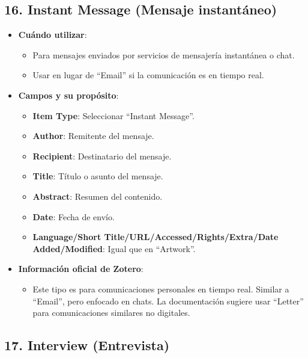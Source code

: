 \documentclass[
  jou,
  floatsintext,
  longtable,
  a4paper,
  nolmodern,
  notxfonts,
  notimes,
  colorlinks=true,linkcolor=blue,citecolor=blue,urlcolor=blue]{apa7}
\providecommand{\tightlist}{%
  \setlength{\itemsep}{0pt}\setlength{\parskip}{0pt}}
\begin{document}
\subsection{16. Instant Message (Mensaje
instantáneo)}\label{instant-message-mensaje-instantuxe1neo}

\begin{itemize}
\tightlist
\item
  \textbf{Cuándo utilizar}:

  \begin{itemize}
  \tightlist
  \item
    Para mensajes enviados por servicios de mensajería instantánea o
    chat.
  \item
    Usar en lugar de ``Email'' si la comunicación es en tiempo real.
  \end{itemize}
\item
  \textbf{Campos y su propósito}:

  \begin{itemize}
  \tightlist
  \item
    \textbf{Item Type}: Seleccionar ``Instant Message''.
  \item
    \textbf{Author}: Remitente del mensaje.
  \item
    \textbf{Recipient}: Destinatario del mensaje.
  \item
    \textbf{Title}: Título o asunto del mensaje.
  \item
    \textbf{Abstract}: Resumen del contenido.
  \item
    \textbf{Date}: Fecha de envío.
  \item
    \textbf{Language/Short Title/URL/Accessed/Rights/Extra/Date
    Added/Modified}: Igual que en ``Artwork''.
  \end{itemize}
\item
  \textbf{Información oficial de Zotero}:

  \begin{itemize}
  \tightlist
  \item
    Este tipo es para comunicaciones personales en tiempo real. Similar
    a ``Email'', pero enfocado en chats. La documentación sugiere usar
    ``Letter'' para comunicaciones similares no digitales.
  \end{itemize}
\end{itemize}

\subsection{17. Interview (Entrevista)}\label{interview-entrevista}
\end{document}
